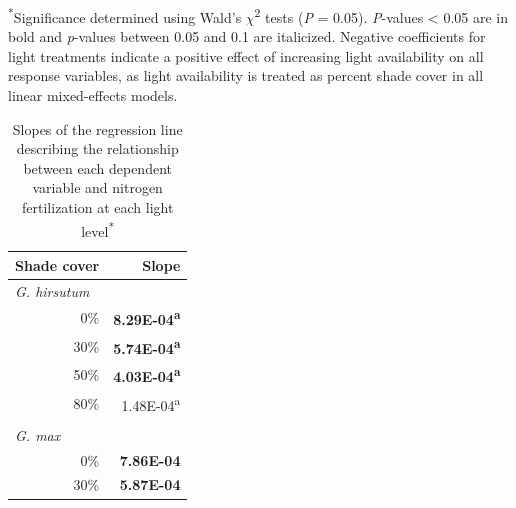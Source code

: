 \begin{singlespace}
\noindent \textsuperscript{*}Significance determined using Wald’s $\chi$\textsuperscript{2} tests (\textit{P} = 0.05). \textit{P}-values < 0.05 are in bold and \textit{p}-values between 0.05 and 0.1 are italicized. Negative coefficients for light treatments indicate a positive effect of increasing light availability on all response variables, as light availability is treated as percent shade cover in all linear mixed-effects models.
\end{singlespace}
\clearpage

\newpage
\begin{landscape}
    \begin{table}
        \caption{Slopes of the regression line describing the relationship between each dependent variable and nitrogen fertilization at each light level\textsuperscript{*}}
        \centering
            \begin{tabular}{p{0.5cm}p{2cm}p{3cm}}
            \hline
            \multicolumn{2}{r}{Shade cover} 
            & \multicolumn{1}{r}{Slope}
            \\
            \hline
             
            \multicolumn{2}{l}{\textit{G. hirsutum}} & \\
            & \multicolumn{1}{r}{0\%}
            &  \multicolumn{1}{r}{\textbf{8.29E-04\textsuperscript{a}}}
            \\
            & \multicolumn{1}{r}{30\%}                     
            &  \multicolumn{1}{r}{\textbf{5.74E-04\textsuperscript{a}}}
            \\
            & \multicolumn{1}{r}{50\%}
            &  \multicolumn{1}{r}{\textbf{4.03E-04\textsuperscript{a}}}
            \\
            & \multicolumn{1}{r}{80\%}
            &  \multicolumn{1}{r}{1.48E-04\textsuperscript{a}}
            \\
            && 
            \\

            \multicolumn{2}{l}{\textit{G. max}} &
            \\
            & \multicolumn{1}{r}{0\%}
            &  \multicolumn{1}{r}{\textbf{7.86E-04}}
            \\
              
            & \multicolumn{1}{r}{30\%}
            &  \multicolumn{1}{r}{\textbf{5.87E-04}}
            \\
              

\end{tabular}
\end{table}
\end{landscape}
